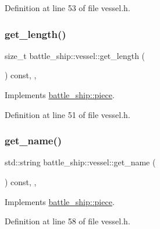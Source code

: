 Definition at line 53 of file vessel.\+h.

\mbox{\label{classbattle__ship_1_1vessel_ae166b521339b6a7b8c0be1a9d7861131}} 
\subsubsection{\texorpdfstring{get\+\_\+length()}{get\_length()}}
{\footnotesize\ttfamily size\+\_\+t battle\+\_\+ship\+::vessel\+::get\+\_\+length (\begin{DoxyParamCaption}{ }\end{DoxyParamCaption}) const\hspace{0.3cm}{\ttfamily [inline]}, {\ttfamily [override]}, {\ttfamily [virtual]}}



Implements \hyperlink{classbattle__ship_1_1piece_a0188cda34ef90374396c52595761ef08}{battle\+\_\+ship\+::piece}.



Definition at line 51 of file vessel.\+h.

\mbox{\label{classbattle__ship_1_1vessel_a623a1b35355db117b5381a3a0f5774eb}} 
\subsubsection{\texorpdfstring{get\+\_\+name()}{get\_name()}}
{\footnotesize\ttfamily std\+::string battle\+\_\+ship\+::vessel\+::get\+\_\+name (\begin{DoxyParamCaption}{ }\end{DoxyParamCaption}) const\hspace{0.3cm}{\ttfamily [inline]}, {\ttfamily [override]}, {\ttfamily [virtual]}}



Implements \hyperlink{classbattle__ship_1_1piece_a95531d660360ffc403a742db1b4f6413}{battle\+\_\+ship\+::piece}.



Definition at line 58 of file vessel.\+h.

